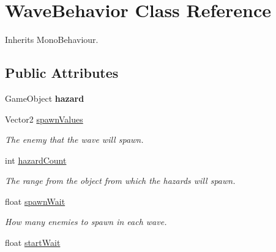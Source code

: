 \hypertarget{class_wave_behavior}{}\section{Wave\+Behavior Class Reference}
\label{class_wave_behavior}


Inherits Mono\+Behaviour.

\subsection*{Public Attributes}
\begin{DoxyCompactItemize}
\item 
\mbox{\label{class_wave_behavior_a6890b5a829fbd0d27517b75ab3e9fa12}} 
Game\+Object {\bfseries hazard}
\item 
\mbox{\label{class_wave_behavior_ae26807be7d4406478efc4886aa610189}} 
Vector2 \mbox{\hyperlink{class_wave_behavior_ae26807be7d4406478efc4886aa610189}{spawn\+Values}}
\begin{DoxyCompactList}\small\item\em The enemy that the wave will spawn. \end{DoxyCompactList}\item 
\mbox{\label{class_wave_behavior_a3790e0815c8d88a71e77e3227b050b42}} 
int \mbox{\hyperlink{class_wave_behavior_a3790e0815c8d88a71e77e3227b050b42}{hazard\+Count}}
\begin{DoxyCompactList}\small\item\em The range from the object from which the hazards will spawn. \end{DoxyCompactList}\item 
\mbox{\label{class_wave_behavior_a401c9221c61cc6b50bc1d538b5365555}} 
float \mbox{\hyperlink{class_wave_behavior_a401c9221c61cc6b50bc1d538b5365555}{spawn\+Wait}}
\begin{DoxyCompactList}\small\item\em How many enemies to spawn in each wave. \end{DoxyCompactList}\item 
\mbox{\label{class_wave_behavior_ae8cd1f5cb102b67698fd4043bf2314d2}} 
float \mbox{\hyperlink{class_wave_behavior_ae8cd1f5cb102b67698fd4043bf2314d2}{start\+Wait}}

\end{DoxyCompactItemize}
